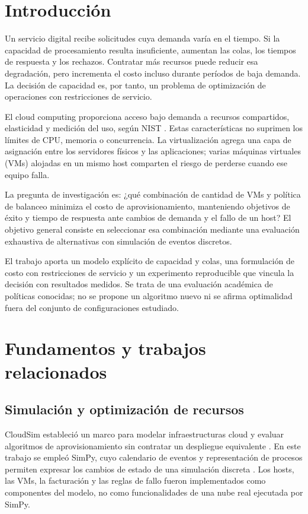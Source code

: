 \section{Introducción}
Un servicio digital recibe solicitudes cuya demanda varía en el tiempo. Si la capacidad de procesamiento resulta insuficiente, aumentan las colas, los tiempos de respuesta y los rechazos. Contratar más recursos puede reducir esa degradación, pero incrementa el costo incluso durante períodos de baja demanda. La decisión de capacidad es, por tanto, un problema de optimización de operaciones con restricciones de servicio.

El cloud computing proporciona acceso bajo demanda a recursos compartidos, elasticidad y medición del uso, según NIST \cite{nist}. Estas características no suprimen los límites de CPU, memoria o concurrencia. La virtualización agrega una capa de asignación entre los servidores físicos y las aplicaciones; varias máquinas virtuales (VMs) alojadas en un mismo host comparten el riesgo de perderse cuando ese equipo falla.

La pregunta de investigación es: ¿qué combinación de cantidad de VMs y política de balanceo minimiza el costo de aprovisionamiento, manteniendo objetivos de éxito y tiempo de respuesta ante cambios de demanda y el fallo de un host? El objetivo general consiste en seleccionar esa combinación mediante una evaluación exhaustiva de alternativas con simulación de eventos discretos.

El trabajo aporta un modelo explícito de capacidad y colas, una formulación de costo con restricciones de servicio y un experimento reproducible que vincula la decisión con resultados medidos. Se trata de una evaluación académica de políticas conocidas; no se propone un algoritmo nuevo ni se afirma optimalidad fuera del conjunto de configuraciones estudiado.

\section{Fundamentos y trabajos relacionados}
\subsection{Simulación y optimización de recursos}
CloudSim estableció un marco para modelar infraestructuras cloud y evaluar algoritmos de aprovisionamiento sin contratar un despliegue equivalente \cite{cloudsim}. En este trabajo se empleó SimPy, cuyo calendario de eventos y representación de procesos permiten expresar los cambios de estado de una simulación discreta \cite{simpy}. Los hosts, las VMs, la facturación y las reglas de fallo fueron implementados como componentes del modelo, no como funcionalidades de una nube real ejecutada por SimPy.

